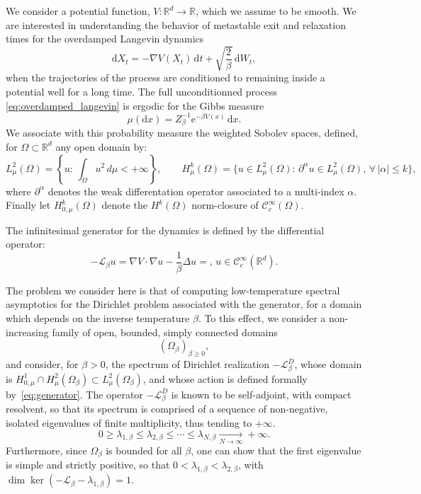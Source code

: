 \documentclass[10pt]{article}
\newcommand{\cL}{\mathcal{L}}
\renewcommand{\d}{\mathrm{d}}
\newcommand{\e}{\mathrm{e}}
\newcommand{\R}{\mathbb{R}}
\newcommand{\1}{\mathbbm 1}
\begin{document}
    We consider a potential function, $V : \R^d \to \R$, which we assume to be smooth.
    We are interested in understanding the behavior of metastable exit and relaxation times for the overdamped Langevin dynamics
    \begin{equation}
        \label{eq:overdamped_langevin}
        \d X_t = -\nabla V(X_t)\,\d t + \sqrt{\frac2\beta}\, \d W_t,
    \end{equation}
    when the trajectories of the process are conditioned to remaining inside a potential well for a long time.
    The full unconditionned process \eqref{eq:overdamped_langevin} is ergodic for the Gibbs measure
    \[\mu(\d x) = Z_\beta^{-1}\e^{-\beta V(x)}\,\d x.\]
    We associate with this probability measure the weighted Sobolev spaces, defined, for $\Omega\subset \R^d$ any open domain by:
    \begin{equation}
        \label{eq:sobolev_spaces}
        L_\mu^2(\Omega) = \left\{u:\,\int_{\Omega} u^2 \,d\mu < +\infty\right\},\qquad H^{k}_\mu(\Omega) = \{u\in L^2_\mu(\Omega):\,\partial^{\alpha}u\in L^2_\mu(\Omega),\,\forall\, |\alpha|\leq k\},
    \end{equation}
    where $\partial^\alpha$ denotes the weak differentation operator associated to a multi-index $\alpha$. Finally let $H_{0,\mu}^k(\Omega)$ denote the $H^k(\Omega)$ norm-closure of $\mathcal C^\infty_c(\Omega)$.

    The infinitesimal generator for the dynamics is defined by the differential operator:
    \begin{equation}
        \label{eq:generator}
        -\cL_\beta u = \nabla V \cdot \nabla u - \frac1\beta \Delta u=,\, u \in \mathcal C^\infty_c(\R^d).
    \end{equation}

    The problem we consider here is that of computing low-temperature spectral asymptotics for the Dirichlet problem associated with the generator, for a domain which depends on the inverse temperature $\beta$.
    To this effect, we consider a non-increasing family of open, bounded, simply connected domains
    \[(\Omega_\beta)_{\beta \geq 0},\]
    and consider, for $\beta>0$, the spectrum of Dirichlet realization $-\cL_\beta^D$, whose domain is $H_{0,\mu}^1\cap H^2_{\mu}(\Omega_\beta) \subset L^2_\mu(\Omega_\beta)$,
    and whose action is defined formally by~\eqref{eq:generator}.
    The operator $-\cL_\beta^D$ is known to be self-adjoint, with compact resolvent, so that its spectrum is comprised of a sequence of non-negative, isolated eigenvalues of finite multiplicity, thus tending to $+\infty$.
    $$0\geq\lambda_{1,\beta} \leq \lambda_{2,\beta}\leq \dotsm \leq\lambda_{N,\beta} \underset{N\to\infty}{\longrightarrow}+\infty.$$
    Furthermore, since $\Omega_\beta$ is bounded for all $\beta$, one can show that the first eigenvalue is simple and strictly positive, so that $0<\lambda_{1,\beta} < \lambda_{2,\beta}$, with $\dim \ker \left(-\cL_\beta-\lambda_{1,\beta}\right)=1$.
\end{document}
